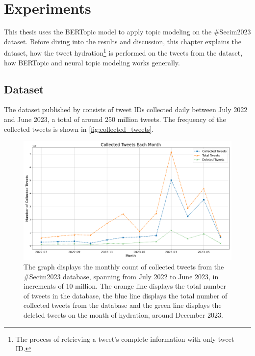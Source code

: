 
\chapter{Experiments}\label{chapter:experiments}

This thesis uses the BERTopic model to apply topic modeling on the \#Secim2023 dataset. 
Before diving into the results and discussion, this chapter explains the dataset, 
how the tweet hydration\footnote{The process of retrieving a tweet's complete information
with only tweet ID.} is performed on the tweets from the dataset, how BERTopic and 
neural topic modeling works generally.

\section{Dataset}

The dataset published by \textcite{secim2023} consists of tweet IDs collected daily 
between July 2022 and June 2023, a total of around 250 million tweets. 
The frequency of the collected tweets is shown in \autoref{fig:collected_tweets}.

\begin{figure}[htb]
    \centering
    \includegraphics[width=\linewidth]{figures/collected_tweets_2.png}
    \caption[Collected Tweets each month]
    {The graph displays the monthly count of collected tweets from the \#Secim2023 database, 
    spanning from July 2022 to June 2023, in increments of 10 million.
    The orange line displays the total number of tweets in the database, 
    the blue line displays the total number of collected tweets from the database and 
    the green line displays the deleted tweets on the month of hydration, around
    December 2023.}\label{fig:collected_tweets}
\end{figure}

